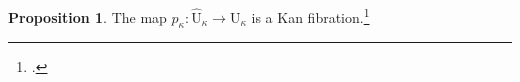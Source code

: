 \documentclass[10pt,letterpaper,cm]{nupset}
\theoremstyle{definition}
\theoremstyle{theorem}
\newtheorem{prop}[definition]{Proposition}
\newtheorem*{claim}{Claim}
\theoremstyle{remark}
\newcommand{\0}{\mathbf{0}}
\newcommand{\1}{\mathbf{1}}
\newcommand{\2}{\mathbf{2}}
\begin{document}
\begin{prop}\label{univfib}
The map $p_{\kappa} : \widehat{\mathrm{U}}_{\kappa} \to \mathrm{U}_{\kappa}$ is a Kan fibration.\footnote{\autocite[Lemma 2.1.10]{KL}.}
\end{prop}
\begin{comment}
\begin{proof}
We need to solve any lifting problem of the form
\[
\begin{tikzcd}
{\Lambda^k[n]} \arrow[r] \arrow[d, hook]        & \widehat{\mathrm{U}}_{\kappa}\arrow[d, "p_{\kappa}"] \\
{\Delta[n]} \arrow[r, "\ulcorner{x}\urcorner"'] & \mathrm{U}_{\kappa}                                  
\end{tikzcd}.
\]
By the universal property of pullback squares, we have a commutative diagram of the form
\[
\begin{tikzcd}[row sep=large]\label{twopulls}
{\Lambda^k[n]} \arrow[d, hook] \arrow[r, dashed] & Z \arrow[r] \arrow[d, "x"]       \arrow[dr, phantom, "\scalebox{1.5}{\color{black}$\lrcorner$}" , very near start, color=black]                &\widehat{\mathrm{U}}_{\kappa} \arrow[d, "p_{\kappa}"] \\
{\Delta[n]} \arrow[r, equal]                            & {\Delta[n]} \arrow[r, "\ulcorner{x}\urcorner"'] &  \mathrm{U}_{\kappa}                                             
\end{tikzcd}. \tag{$\ast$}
\]
\begin{claim}
The map $x: Z \to \Delta[n]$ is a Kan fibration.
\end{claim}
\begin{proof}
\textit{To appear.}
\end{proof}
This means that there is a diagonal fill-in $\Delta[n] \to Z$ for the lefthand square of \eqref{twopulls}. Then the composite $\Delta[n] \to Z \to \widehat{\mathrm{U}}_{\kappa}$ is a solution to our original lifting problem. 
\end{proof}
\end{comment}
\end{document}
